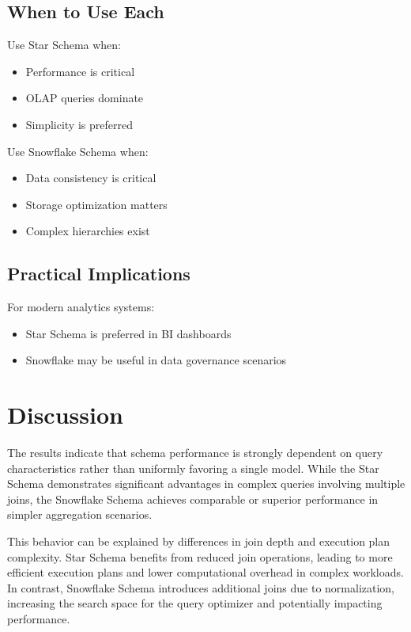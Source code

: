\documentclass[conference]{IEEEtran}
\begin{document}
\subsection{When to Use Each}
Use Star Schema when:

\begin{itemize}
    \item Performance is critical
    \item OLAP queries dominate
    \item Simplicity is preferred
\end{itemize}

Use Snowflake Schema when:

\begin{itemize}
    \item Data consistency is critical
    \item Storage optimization matters
    \item Complex hierarchies exist
\end{itemize}

\subsection{Practical Implications}

For modern analytics systems:

\begin{itemize}
    \item Star Schema is preferred in BI dashboards
    \item Snowflake may be useful in data governance scenarios
\end{itemize}


\section{Discussion}

The results indicate that schema performance is strongly dependent on query characteristics rather than uniformly favoring a single model. While the Star Schema demonstrates significant advantages in complex queries involving multiple joins, the Snowflake Schema achieves comparable or superior performance in simpler aggregation scenarios.

This behavior can be explained by differences in join depth and execution plan complexity. Star Schema benefits from reduced join operations, leading to more efficient execution plans and lower computational overhead in complex workloads. In contrast, Snowflake Schema introduces additional joins due to normalization, increasing the search space for the query optimizer and potentially impacting performance.
\end{document}
